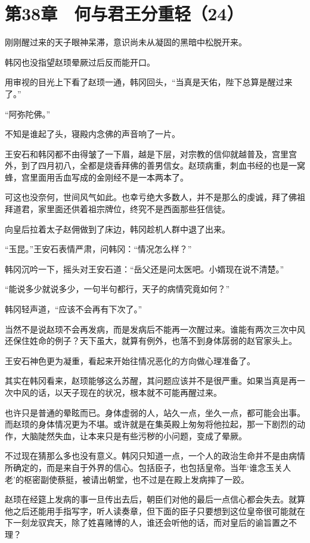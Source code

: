 \section{第38章　何与君王分重轻（24）}

刚刚醒过来的天子眼神呆滞，意识尚未从凝固的黑暗中松脱开来。

韩冈也没指望赵顼晕厥过后反而能开口。

用审视的目光上下看了赵顼一通，韩冈回头，“当真是天佑，陛下总算是醒过来了。”

“阿弥陀佛。”

不知是谁起了头，寝殿内念佛的声音响了一片。

王安石和韩冈都不由得皱了一下眉，越是下层，对宗教的信仰就越普及，宫里宫外，到了四月初八，全都是烧香拜佛的善男信女。赵顼病重，刺血书经的也是一窝蜂，宫里面用舌血写成的金刚经不是一本两本了。

可这也没奈何，世间风气如此。也幸亏绝大多数人，并不是那么的虔诚，拜了佛祖拜道君，家里面还供着祖宗牌位，终究不是西面那些狂信徒。

向皇后拉着太子赵佣做到了床边，韩冈趁机人群中退了出来。

“玉昆。”王安石表情严肃，问韩冈：“情况怎么样？”

韩冈沉吟一下，摇头对王安石道：“岳父还是问太医吧。小婿现在说不清楚。”

“能说多少就说多少，一句半句都行，天子的病情究竟如何？”

韩冈轻声道，“应该不会再有下次了。”

当然不是说赵顼不会再发病，而是发病后不能再一次醒过来。谁能有两次三次中风还保住姓命的例子？天下虽大，就算有例外，也落不到身体孱弱的赵官家头上。

王安石神色更为凝重，看起来开始往情况恶化的方向做心理准备了。

其实在韩冈看来，赵顼能够这么苏醒，其问题应该并不是很严重。如果当真是再一次中风的话，以天子现在的状况，根本就不可能再醒过来。

也许只是普通的晕眩而已。身体虚弱的人，站久一点，坐久一点，都可能会出事。而赵顼的身体情况更为不堪。或许就是在集英殿上匆匆将他拉起，那一下剧烈的动作，大脑陡然失血，让本来只是有些污秽的小问题，变成了晕厥。

不过现在猜那么多也没有意义。韩冈只知道一点，一个人的政治生命并不是由病情所确定的，而是来自于外界的信心。包括臣子，也包括皇帝。当年‘谁念玉关人老’的枢密副使蔡挺，被请出朝堂，也不过是在殿上发病摔了一跤。

赵顼在经筵上发病的事一旦传出去后，朝臣们对他的最后一点信心都会失去。就算他之后还能用手指写字，听人读奏章，但下面的臣子只要想到这位皇帝很可能就在下一刻龙驭宾天，除了姓喜赌博的人，谁还会听他的话，而对皇后的谕旨置之不理？

